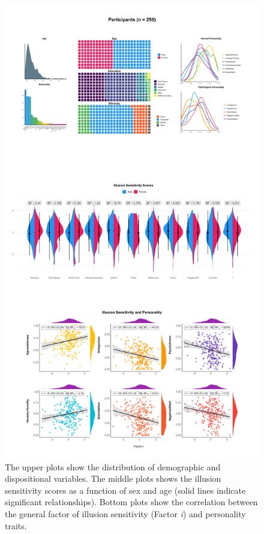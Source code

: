 \documentclass[
  man,floatsintext]{apa6}
\begin{document}
\begin{figure}
\includegraphics[width=1\linewidth]{figures/Figure3} \caption{The upper plots show the distribution of demographic and dispositional variables. The middle plots shows the illusion sensitivity scores as a function of sex and age (solid lines indicate significant relationships). Bottom plots show the correlation between the general factor of illusion sensitivity (Factor \textit{i}) and personality traits.}\label{fig:unnamed-chunk-4}
\end{figure}
\end{document}
